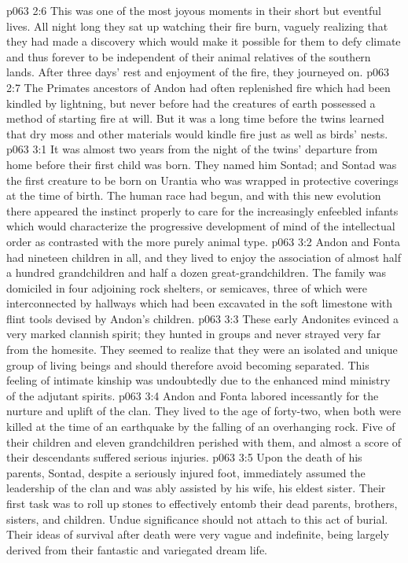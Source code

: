 \vs p063 2:6 This was one of the most joyous moments in their short but eventful lives. All night long they sat up watching their fire burn, vaguely realizing that they had made a discovery which would make it possible for them to defy climate and thus forever to be independent of their animal relatives of the southern lands. After three days’ rest and enjoyment of the fire, they journeyed on.
\vs p063 2:7 The Primates ancestors of Andon had often replenished fire which had been kindled by lightning, but never before had the creatures of earth possessed a method of starting fire at will. But it was a long time before the twins learned that dry moss and other materials would kindle fire just as well as birds’ nests.
\vs p063 3:1 It was almost two years from the night of the twins’ departure from home before their first child was born. They named him Sontad; and Sontad was the first creature to be born on Urantia who was wrapped in protective coverings at the time of birth. The human race had begun, and with this new evolution there appeared the instinct properly to care for the increasingly enfeebled infants which would characterize the progressive development of mind of the intellectual order as contrasted with the more purely animal type.
\vs p063 3:2 Andon and Fonta had nineteen children in all, and they lived to enjoy the association of almost half a hundred grandchildren and half a dozen great\hyp{}grandchildren. The family was domiciled in four adjoining rock shelters, or semicaves, three of which were interconnected by hallways which had been excavated in the soft limestone with flint tools devised by Andon’s children.
\vs p063 3:3 These early Andonites evinced a very marked clannish spirit; they hunted in groups and never strayed very far from the homesite. They seemed to realize that they were an isolated and unique group of living beings and should therefore avoid becoming separated. This feeling of intimate kinship was undoubtedly due to the enhanced mind ministry of the adjutant spirits.
\vs p063 3:4 \pc Andon and Fonta labored incessantly for the nurture and uplift of the clan. They lived to the age of forty\hyp{}two, when both were killed at the time of an earthquake by the falling of an overhanging rock. Five of their children and eleven grandchildren perished with them, and almost a score of their descendants suffered serious injuries.
\vs p063 3:5 Upon the death of his parents, Sontad, despite a seriously injured foot, immediately assumed the leadership of the clan and was ably assisted by his wife, his eldest sister. Their first task was to roll up stones to effectively entomb their dead parents, brothers, sisters, and children. Undue significance should not attach to this act of burial. Their ideas of survival after death were very vague and indefinite, being largely derived from their fantastic and variegated dream life.
